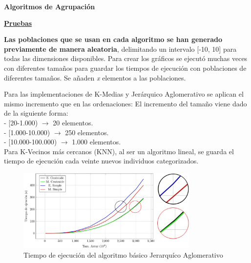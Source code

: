 \begin{flushleft}
\textbf{Algoritmos de Agrupación}
	\begin{mdframed}[roundcorner=5pt]
		\textbf{\underline{Pruebas}}
		\vspace{0.1cm}
		
		\scriptsize	
		\textbf{Las poblaciones que se usan en cada algoritmo se han generado previamente de manera aleatoria}, delimitando un intervalo [-10, 10] para todas las dimensiones disponibles. Para crear los gráficos se ejecutó muchas veces con diferentes tamaños para guardar los tiempos de ejecución con poblaciones de diferentes tamaños. Se añaden \textit{x} elementos a las poblaciones.
		
		
		\begin{tcolorbox}[boxrule=0.5pt, fontupper=\small]
			\scriptsize
			Para las implementaciones de K-Medias y Jerárquico Aglomerativo se aplican el mismo incremento que en las ordenaciones:
			El incremento del tamaño viene dado de la siguiente forma:\\
			- [20-1.000) $\rightarrow$ 20 elementos.\\
			- [1.000-10.000) $\rightarrow$ 250 elementos.\\
			- [10.000-100.000) $\rightarrow$ 1.000 elementos.\\
			
			Para K-Vecinos más cercanos (KNN), al ser un algoritmo lineal, se guarda el tiempo de ejecución cada veinte nuevos individuos categorizados.
			
		\end{tcolorbox}
		
	\end{mdframed}
\end{flushleft}





\begin{figure}[!h]
	\centering
	\includegraphics[width=0.8\textwidth]{images/jerarquico}
	\caption{Tiempo de ejecución del algoritmo básico Jerarquíco Aglomerativo}
	\label{fig:example}
\end{figure}



